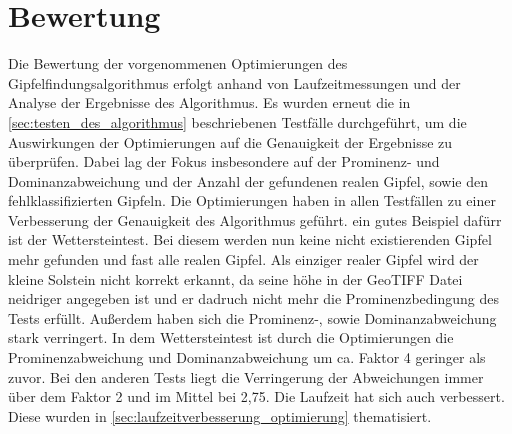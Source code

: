 \section{Bewertung} \label{sec:bewertung_optimierung}
Die Bewertung der vorgenommenen Optimierungen des Gipfelfindungsalgorithmus erfolgt anhand von Laufzeitmessungen und der Analyse der Ergebnisse des Algorithmus. Es wurden erneut die in \ref{sec:testen_des_algorithmus} beschriebenen Testfälle durchgeführt, um die Auswirkungen der Optimierungen auf die Genauigkeit der Ergebnisse zu überprüfen. Dabei lag der Fokus insbesondere auf der Prominenz- und Dominanzabweichung und der Anzahl der gefundenen realen Gipfel, sowie den fehlklassifizierten Gipfeln. Die Optimierungen haben in allen Testfällen zu einer Verbesserung der Genauigkeit des Algorithmus geführt. ein gutes Beispiel dafürr ist der Wettersteintest. Bei diesem werden nun keine nicht existierenden Gipfel mehr gefunden und fast alle realen Gipfel. Als einziger realer Gipfel wird der kleine Solstein nicht korrekt erkannt, da seine höhe in der GeoTIFF Datei neidriger angegeben ist und er dadruch nicht mehr die Prominenzbedingung des Tests erfüllt. Außerdem haben sich die Prominenz-, sowie Dominanzabweichung stark verringert. In dem Wettersteintest ist durch die Optimierungen die Prominenzabweichung und Dominanzabweichung um ca. Faktor 4 geringer als zuvor. Bei den anderen Tests liegt die Verringerung der Abweichungen immer über dem Faktor 2 und im Mittel bei 2,75. Die Laufzeit hat sich auch verbessert. Diese wurden in \ref{sec:laufzeitverbesserung_optimierung} thematisiert. 
